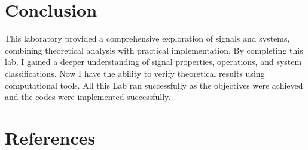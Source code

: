 \documentclass[10pt, twocolumn]{article}
\begin{document}
\section{Conclusion}
This laboratory provided a comprehensive exploration of signals and systems, combining theoretical analysis with practical implementation. By completing this lab, I gained a
 deeper understanding of signal properties, operations, and system classifications. Now I have the ability to verify theoretical results using computational tools. All this Lab ran successfully as the objectives were achieved and the codes were implemented successfully.
 \section{References} 
 \nocite{*}
 \printbibliography




 
\end{document}
